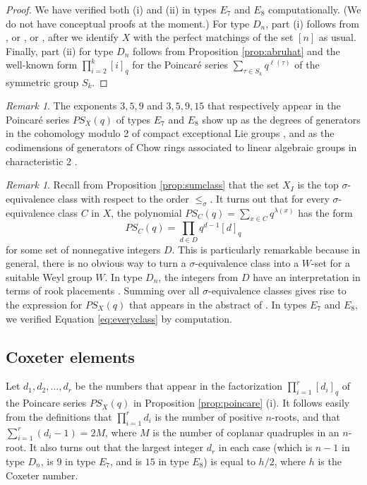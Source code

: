 \documentclass[11pt]{amsart}
\theoremstyle{plain}
\theoremstyle{definition}
\theoremstyle{remark}
\newtheorem{rmk}[theorem]{Remark}
\numberwithin{equation}{subsection}
\newcommand{\coplanar}{coplanar\xspace}
\begin{document}
\begin{proof}
We have verified both (i) and (ii) in types $E_7$ and $E_8$ computationally. (We
do not have conceptual proofs at the moment.) For type $D_n$, part (i) follows
from \cite[Equation (5.4)]{simion96}, or \cite[Theorem 4]{diaz09}, or
\cite[Corollary 3.3]{cheon15}, after we identify $X$ with the perfect matchings
of the set $[n]$ as usual. Finally, part (ii) for type $D_n$ follows from
Proposition \ref{prop:abruhat} and the well-known form $\prod_{i=2}^k [i]_q$ for
the Poincar\'e series $\sum_{\tau\in S_k}q^{\ell(\tau)}$ of the symmetric group
$S_k$.
\end{proof}

\begin{rmk}
\label{rmk:cohomology}
The exponents $3, 5, 9$ and $3, 5, 9, 15$ that respectively appear in the
Poincar\'e series $PS_X(q)$ of types $E_7$ and $E_8$ show up as the degrees of
generators in the cohomology modulo 2 of compact exceptional Lie groups
\cite{araki61}, and as the codimensions of generators of Chow rings associated
to linear algebraic groups in characteristic 2 \cite[Section 4]{petrov08}.
\end{rmk}


\begin{rmk}\label{rmk:xs}
Recall from Proposition \ref{prop:sumclass} that the set $X_I$ is the top
$\sigma$-equivalence class with respect to the order $\le_\sigma$.  It turns out
that for every $\sigma$-equivalence class $C$ in $X$, the polynomial
$PS_C(q)=\sum_{x\in C}q^{\lambda(x)}$ has the form \begin{equation}
    \label{eq:everyclass} PS_C(q)=\prod_{d \in D} q^{d-1} [d]_q
\end{equation} for some set of nonnegative integers $D$.  This is particularly
    remarkable because in general, there is no obvious way to turn a
    $\sigma$-equivalence class into a $W$-set for a suitable Weyl group $W$.  In
    type $D_n$, the integers from $D$ have an interpretation in terms of rook
    placements \cite[Theorem 1]{watson14}. Summing over all $\sigma$-equivalence
    classes gives rise to the expression for $PS_X(q)$ that appears in the
    abstract of \cite{billera15}. In types $E_7$ and $E_8$, we verified Equation
    \eqref{eq:everyclass} by computation.
\end{rmk}

\subsection{Coxeter elements}
\label{sec:coxeter_elements}
Let $d_1, d_2, \ldots, d_r$ be the numbers that appear in the factorization
$\prod_{i=1}^r [d_i]_q$ of the Poincare series $PS_X(q)$ in Proposition
\ref{prop:poincare} (i).  It follows easily from the definitions that
$\prod_{i=1}^r d_i$ is the number of positive $n$-roots, and that $\sum_{i=1}^r
(d_i-1) = 2M$, where $M$ is the number of \coplanar quadruples in an $n$-root.
It also turns out that the largest integer $d_r$ in each case (which is $n-1$ in
type $D_n$, is $9$ in type $E_7$, and is $15$ in type $E_8$) is equal to $h/2$,
where $h$ is the Coxeter number.
\end{document}
